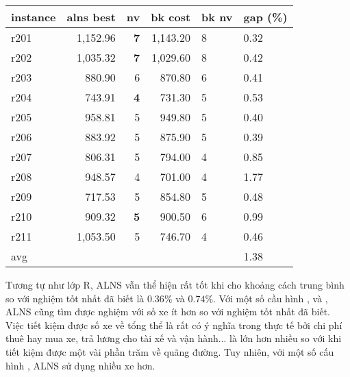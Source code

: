   \begin{table}[caption={Kết quả đo với tập Solomon R2}, label=exp:solomonR2, placement=h]
    \small
    \centering
    \begin{tabular}{lrrrll}
    \hline
    instance & alns best & nv & bk cost & bk nv & gap (\%) \\ \hline
    r201 & 1,152.96 & \textbf{7} & 1,143.20 & 8 & 0.32 \\ \hline
    r202 & 1,035.32 & \textbf{7} & 1,029.60 & 8 & 0.42 \\ \hline
    r203 & 880.90 & 6 & 870.80 & 6 & 0.41 \\ \hline
    r204 & 743.91 & \textbf{4} & 731.30 & 5 & 0.53 \\ \hline
    r205 & 958.81 & 5 & 949.80 & 5 & 0.40 \\ \hline
    r206 & 883.92 & 5 & 875.90 & 5 & 0.39 \\ \hline
    r207 & 806.31 & 5 & 794.00 & 4 & 0.85 \\ \hline
    r208 & 948.57 & 4 & 701.00 & 4 & 1.77 \\ \hline
    r209 & 717.53 & 5 & 854.80 & 5 & 0.48 \\ \hline
    r210 & 909.32 & \textbf{5} & 900.50 & 6 & 0.99 \\ \hline
    r211 & 1,053.50 & 5 & 746.70 & 4 & 0.46 \\ \hline
    avg &  &  &  &  & 1.38 \\ \hline
    \end{tabular}
  \end{table}

  Tương tự như lớp R, ALNS vẫn thể hiện rất tốt khi cho khoảng cách trung bình so với nghiệm tốt nhất đã biết là $0.36\%$ và $0.74\%$. Với một số cầu hình ,  và , ALNS cũng tìm được nghiệm với số xe ít hơn so với nghiệm tốt nhất đã biết. Việc tiết kiệm được số xe về tổng thể là rất có ý nghĩa trong thực tế  bởi chi phí thuê hay mua xe, trả lương cho tài xế và vận hành... là lớn hơn nhiều so với khi tiết kiệm được một vài phần trăm về quãng đường. Tuy nhiên, với một số cấu hình , ALNS sử dụng nhiều xe hơn.

